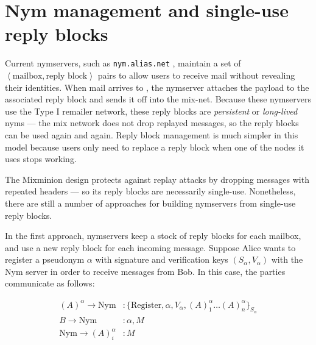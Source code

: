 \documentclass[final,inpress,inline]{ieee}
\newcommand\emailaddr{\begingroup \def\UrlLeft{<}\def\UrlRight{>}\urlstyle{tt}\Url}
\begin{document}


\section{Nym management and single-use reply blocks}
\label{sec:nymservers}

Current nymservers, such as {\tt nym.alias.net} \cite{nym-alias-net},
maintain a set of $\left<\mbox{mailbox}, \mbox{reply block}\right>$ 
pairs to allow users to
receive mail without revealing their identities. When mail arrives to
\emailaddr{bob@nym.alias.net}, the nymserver attaches the payload to
the associated
reply block and sends it off into the mix-net. Because these nymservers
use the Type I remailer network, these reply blocks are \emph{persistent}
or \emph{long-lived} nyms --- the mix network does not drop replayed
messages, so the reply blocks can be used again and again. Reply block
management is much simpler in this model because users only need to
replace a reply block when one of the nodes it uses stops working.

The Mixminion design protects against replay attacks by dropping messages
with repeated headers --- so its reply blocks are necessarily
single-use. Nonetheless, there are still a number of approaches for building
nymservers from single-use reply blocks.

In the first approach, nymservers keep a stock of reply blocks for
each mailbox, and use a new reply block for each incoming message. 
Suppose Alice wants to register a pseudonym $\alpha$ with signature and
verification keys $(S_\alpha,V_\alpha)$ with the Nym server in order
to receive messages from Bob.  In this case, the parties communicate as
follows: 

\begin{equation}
\begin{aligned}
(A)^\alpha \rightarrow \mathrm{Nym}&: \{\mathrm{Register} , \alpha, V_{\alpha}, (A)^\alpha_1 \dots
(A)^\alpha_n\}_{S_\alpha} \\ 
B \rightarrow \mathrm{Nym}&: \alpha, M \\ 
\mathrm{Nym} \rightarrow (A)^\alpha_i&: M \\
\end{aligned}
\end{equation}
\end{document}
